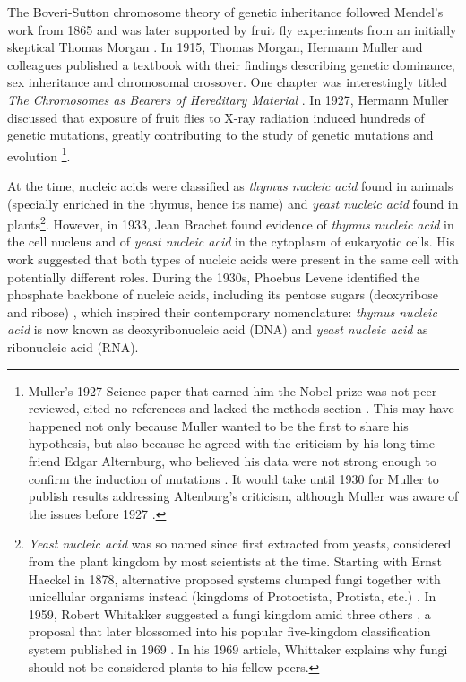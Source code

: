 The Boveri-Sutton chromosome theory of genetic inheritance followed Mendel's work from 1865 \cite{sutton:1902tx} and was later supported by fruit fly experiments from an initially skeptical Thomas Morgan \cite{morgan:1915tw}. In 1915, Thomas Morgan, Hermann Muller and colleagues published a textbook with their findings describing genetic dominance, sex inheritance and chromosomal crossover. One chapter was interestingly titled \emph{The Chromosomes as Bearers of Hereditary Material} \cite{morgan:1915tw}. In 1927, Hermann Muller discussed that exposure of fruit flies to X-ray radiation induced hundreds of genetic mutations, greatly contributing to the study of genetic mutations and evolution \cite{muller:1927wl}\footnote{Muller's 1927 Science paper \cite{muller:1927wl} that earned him the Nobel prize was not peer-reviewed, cited no references and lacked the methods section \cite{calabrese:2018vl}. This may have happened not only because Muller wanted to be the first to share his hypothesis, but also because he agreed with the criticism by his long-time friend Edgar Alternburg, who believed his data were not strong enough to confirm the induction of mutations \cite{calabrese:2018vl}. It would take until 1930 for Muller to publish results addressing Altenburg's criticism, although Muller was aware of the issues before 1927 \cite{calabrese:2018vl}.}.


At the time, nucleic acids were classified as \emph{thymus nucleic acid} found in animals (specially enriched in the thymus, hence its name) and \emph{yeast nucleic acid} found in plants\footnote{\emph{Yeast nucleic acid} was so named since first extracted from yeasts, considered from the plant kingdom by most scientists at the time. Starting with Ernst Haeckel in 1878, alternative proposed systems clumped fungi together with unicellular organisms instead (kingdoms of Protoctista, Protista, etc.) \cite{haeckel:1878tz}. In 1959, Robert Whitakker suggested a fungi kingdom amid three others \cite{whittaker:1959to}, a proposal that later blossomed into his popular five-kingdom classification system published in 1969 \cite{whittaker:1969to}. In his 1969 article, Whittaker explains why fungi should not be considered plants to his fellow peers.}. However, in 1933, Jean Brachet found evidence of \emph{thymus nucleic acid} in the cell nucleus and of \emph{yeast nucleic acid} in the cytoplasm of eukaryotic cells. His work suggested that both types of nucleic acids were present in the same cell with potentially different roles. During the 1930s, Phoebus Levene identified the phosphate backbone of nucleic acids, including its pentose sugars (deoxyribose and ribose) \cite{levene:1929ug}, which inspired their contemporary nomenclature: \emph{thymus nucleic acid} is now known as deoxyribonucleic acid (DNA) and \emph{yeast nucleic acid} as ribonucleic acid (RNA).

